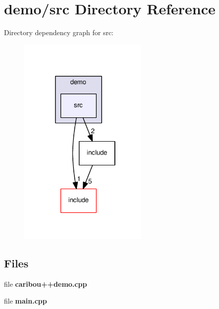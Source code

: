 \section{demo/src Directory Reference}
\label{dir_dad4354341b12cefec84ca4d6cdab423}
Directory dependency graph for src\-:\nopagebreak
\begin{figure}[H]
\begin{center}
\leavevmode
\includegraphics[width=178pt]{dir_dad4354341b12cefec84ca4d6cdab423_dep}
\end{center}
\end{figure}
\subsection*{Files}
\begin{DoxyCompactItemize}
\item 
file {\bf caribou++demo.\-cpp}
\item 
file {\bf main.\-cpp}
\end{DoxyCompactItemize}
